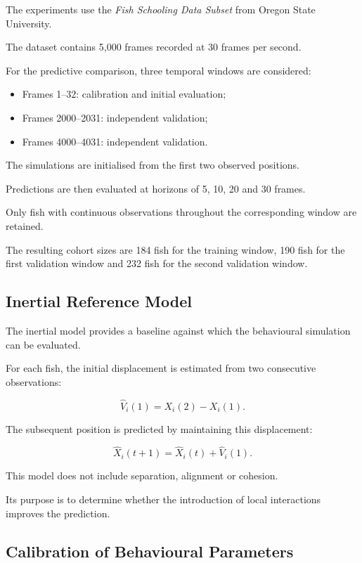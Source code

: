 \documentclass[10pt,a4paper]{article}
\begin{document}
The experiments use the
\emph{Fish Schooling Data Subset}
from Oregon State University.

The dataset contains 5,000 frames
recorded at 30 frames per second.

For the predictive comparison,
three temporal windows are considered:

\begin{itemize}
    \item Frames 1--32:
    calibration and initial evaluation;

    \item Frames 2000--2031:
    independent validation;

    \item Frames 4000--4031:
    independent validation.
\end{itemize}

The simulations are initialised from
the first two observed positions.

Predictions are then evaluated at
horizons of 5, 10, 20 and 30 frames.

Only fish with continuous observations
throughout the corresponding window
are retained.

The resulting cohort sizes are
184 fish for the training window,
190 fish for the first validation window
and 232 fish for the second validation window.

\subsection{Inertial Reference Model}

The inertial model provides a baseline
against which the behavioural simulation
can be evaluated.

For each fish, the initial displacement
is estimated from two consecutive
observations:

\[
\widehat V_i(1)
=
X_i(2)-X_i(1).
\]

The subsequent position is predicted
by maintaining this displacement:

\[
\widehat X_i(t+1)
=
\widehat X_i(t)+\widehat V_i(1).
\]

This model does not include separation,
alignment or cohesion.

Its purpose is to determine whether
the introduction of local interactions
improves the prediction.

\subsection{Calibration of Behavioural Parameters}
\end{document}
